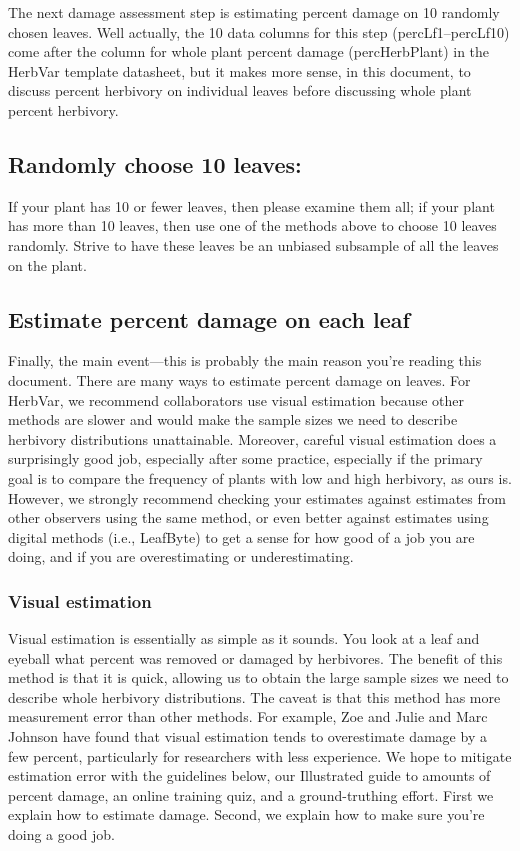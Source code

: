 \documentclass[
  letterpaper,
  DIV=11,
  numbers=noendperiod]{scrreprt}
\begin{document}
The next damage assessment step is estimating percent damage on 10
randomly chosen leaves. Well actually, the 10 data columns for this step
(percLf1--percLf10) come after the column for whole plant percent damage
(percHerbPlant) in the HerbVar template datasheet, but it makes more
sense, in this document, to discuss percent herbivory on individual
leaves before discussing whole plant percent herbivory.

\subsection{Randomly choose 10 leaves:}\label{randomly-choose-10-leaves}

If your plant has 10 or fewer leaves, then please examine them all; if
your plant has more than 10 leaves, then use one of the methods above to
choose 10 leaves randomly. Strive to have these leaves be an unbiased
subsample of all the leaves on the plant.

\subsection{Estimate percent damage on each
leaf}\label{estimate-percent-damage-on-each-leaf}

Finally, the main event---this is probably the main reason you're
reading this document. There are many ways to estimate percent damage on
leaves. For HerbVar, we recommend collaborators use visual estimation
because other methods are slower and would make the sample sizes we need
to describe herbivory distributions unattainable. Moreover, careful
visual estimation does a surprisingly good job, especially after some
practice, especially if the primary goal is to compare the frequency of
plants with low and high herbivory, as ours is. However, we strongly
recommend checking your estimates against estimates from other observers
using the same method, or even better against estimates using digital
methods (i.e., LeafByte) to get a sense for how good of a job you are
doing, and if you are overestimating or underestimating.

\subsubsection{Visual estimation}\label{visual-estimation}

Visual estimation is essentially as simple as it sounds. You look at a
leaf and eyeball what percent was removed or damaged by herbivores. The
benefit of this method is that it is quick, allowing us to obtain the
large sample sizes we need to describe whole herbivory distributions.
The caveat is that this method has more measurement error than other
methods. For example, Zoe and Julie and Marc Johnson have found that
visual estimation tends to overestimate damage by a few percent,
particularly for researchers with less experience. We hope to mitigate
estimation error with the guidelines below, our Illustrated guide to
amounts of percent damage, an online training quiz, and a
ground-truthing effort. First we explain how to estimate damage. Second,
we explain how to make sure you're doing a good job.
\end{document}
